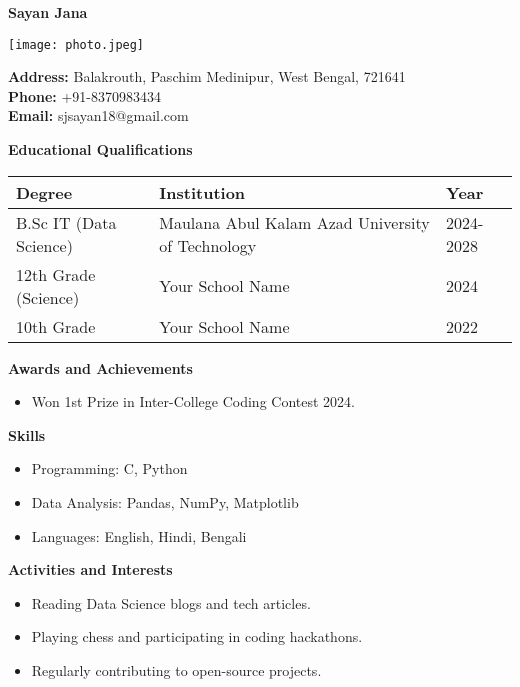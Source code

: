 \documentclass[12pt]{article}
\begin{document}
\begin{flushleft}
    \Huge \textbf{Sayan Jana}
\end{flushleft}

\begin{flushright}
    \texttt{[image: photo.jpeg]}
\end{flushright}

\noindent
\textbf{Address:} Balakrouth, Paschim Medinipur, West Bengal, 721641 \\
\textbf{Phone:} ‪+91-8370983434‬ \\
\textbf{Email:} sjsayan18@gmail.com

\vspace{0.5cm}

\noindent
\textbf{\large Educational Qualifications}

\begin{tabular}{| m{5cm} | m{5cm} | m{3cm} |}
    \hline
    \textbf{Degree} & \textbf{Institution} & \textbf{Year} \\
    \hline
    B.Sc IT (Data Science) & Maulana Abul Kalam Azad University of Technology & 2024-2028 \\
    \hline
    12th Grade (Science) & Your School Name & 2024 \\
    \hline
    10th Grade & Your School Name & 2022 \\
    \hline
\end{tabular}

\vspace{0.5cm}

\noindent
\textbf{\large Awards and Achievements}
\begin{itemize}
    \item Won 1st Prize in Inter-College Coding Contest 2024.
\end{itemize}

\noindent
\textbf{\large Skills}
\begin{itemize}
    \item Programming: C, Python
    \item Data Analysis: Pandas, NumPy, Matplotlib
    \item Languages: English, Hindi, Bengali
\end{itemize}

\noindent
\textbf{\large Activities and Interests}
\begin{itemize}
    \item Reading Data Science blogs and tech articles.
    \item Playing chess and participating in coding hackathons.
    \item Regularly contributing to open-source projects.
\end{itemize}
\end{document}
